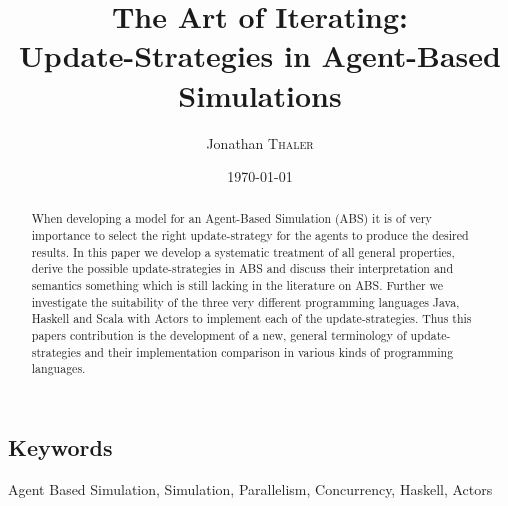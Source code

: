 \documentclass[twocolumn]{article}
\title{The Art of Iterating:\\Update-Strategies in Agent-Based Simulations} %
\author{Jonathan \textsc{Thaler}} %
\date{\today} %
\begin{document}
%
\maketitle %

\begin{abstract}
When developing a model for an Agent-Based Simulation (ABS) it is of very importance to select the right update-strategy for the agents to produce the desired results. In this paper we develop a systematic treatment of all general properties, derive the possible update-strategies in ABS and discuss their interpretation and semantics something which is still lacking in the literature on ABS. Further we investigate the suitability of the three very different programming languages Java, Haskell and  Scala with Actors to implement each of the update-strategies. Thus this papers contribution is the development of a new, general terminology of update-strategies and their implementation comparison in various kinds of programming languages.
\end{abstract}

\subsection*{Keywords}
Agent Based Simulation, Simulation, Parallelism, Concurrency, Haskell, Actors

















\newpage



\end{document}
